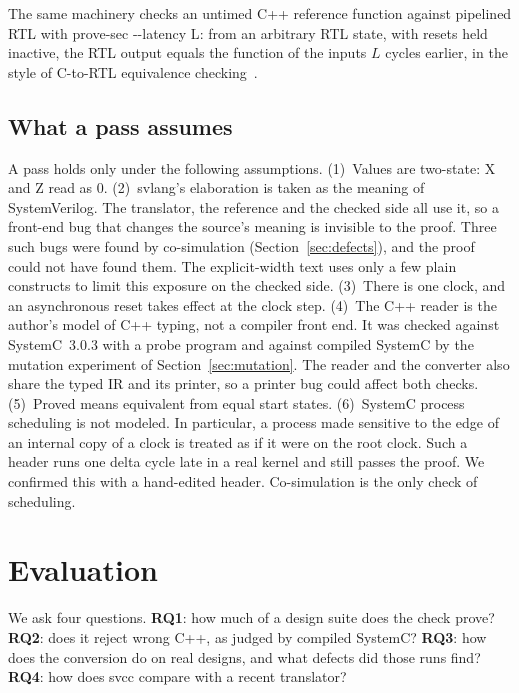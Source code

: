 \documentclass{ieeeaccess}
\newcommand{\code}[1]{{\fontshape{n}\ttfamily #1}}
\begin{document}
The same machinery checks an untimed C++ reference function against pipelined RTL with
\code{prove-sec -{}-latency L}: from an arbitrary RTL state, with resets held inactive, the RTL output
equals the function of the inputs $L$ cycles earlier, in the style of C-to-RTL equivalence
checking~\cite{koelbl2009c2rtl}.

\subsection{What a pass assumes}
\label{sec:assume}

A pass holds only under the following assumptions.
(1)~Values are two-state: X and Z read as 0.
(2)~\code{svlang}'s elaboration is taken as the meaning of SystemVerilog. The translator, the
reference and the checked side all use it, so a front-end bug that changes the source's meaning is
invisible to the proof. Three such bugs were found by co-simulation (Section~\ref{sec:defects}),
and the proof could not have found them. The explicit-width text uses only a few plain constructs
to limit this exposure on the checked side.
(3)~There is one clock, and an asynchronous reset takes effect at the clock step.
(4)~The C++ reader is the author's model of C++ typing, not a compiler front end. It was checked
against SystemC~3.0.3 with a probe program and against compiled SystemC by the mutation experiment
of Section~\ref{sec:mutation}. The reader and the converter also share the typed IR and its printer,
so a printer bug could affect both checks.
(5)~Proved means equivalent from equal start states.
(6)~SystemC process scheduling is not modeled. In particular, a process made sensitive to the edge
of an internal copy of a clock is treated as if it were on the root clock. Such a header runs one
delta cycle late in a real kernel and still passes the proof. We confirmed this with a hand-edited
header. Co-simulation is the only check of scheduling.

\section{Evaluation}
\label{sec:eval}

We ask four questions. \textbf{RQ1}: how much of a design suite does the check prove?
\textbf{RQ2}: does it reject wrong C++, as judged by compiled SystemC? \textbf{RQ3}: how does the
conversion do on real designs, and what defects did those runs find? \textbf{RQ4}: how does
\code{svcc} compare with a recent translator?
\end{document}
